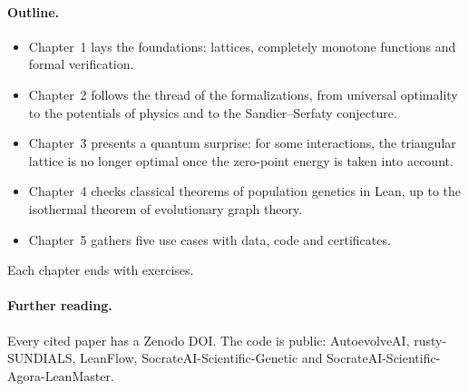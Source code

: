 \paragraph{Outline.}
\begin{itemize}
\item Chapter~1 lays the foundations: lattices, completely monotone functions and formal verification.
\item Chapter~2 follows the thread of the formalizations, from universal optimality to the potentials of physics and
to the Sandier--Serfaty conjecture.
\item Chapter~3 presents a quantum surprise: for some interactions, the triangular lattice is no longer optimal once
the zero-point energy is taken into account.
\item Chapter~4 checks classical theorems of population genetics in Lean, up to the isothermal theorem of
evolutionary graph theory.
\item Chapter~5 gathers five use cases with data, code and certificates.
\end{itemize}
Each chapter ends with exercises.

\paragraph{Further reading.} Every cited paper has a Zenodo DOI. The code is public: AutoevolveAI,
rusty-SUNDIALS, LeanFlow, SocrateAI-Scientific-Genetic and SocrateAI-Scientific-Agora-LeanMaster.
